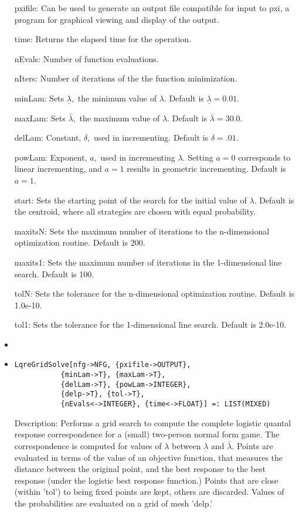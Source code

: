 \begin{itemize}
\bd
\item
[pxifile:] Can be used to generate an output file compatible for input
to pxi, a program for graphical viewing and display of the output.  
\item
[time:] Returns the elapsed time for the operation.
\item
[nEvals:] Number of function evaluations.
\item
[nIters:] Number of iterations of the the function minimization.
\item
[minLam:] Sets $\underline\lambda,$ the minimum value of $\lambda.$
Default is $\underline\lambda = 0.01$.
\item
[maxLam:] Sets $\bar\lambda,$ the maximum value of $\lambda.$  Default is
$\bar\lambda = 30.0.$
\item
[delLam:]  Constant, $\delta,$ used in incrementing.   Default is
$\delta = .01.$
\item
[powLam:] Exponent, $a,$ used in incrementing $\lambda.$  Setting $a = 0$
corresponds to linear incrementing, and $a = 1$ results in geometric
incrementing.  Default is $a = 1$.
\item
[start:] Sets the starting point of the search for the initial value of
$\lambda.$  Default is the centroid, where all strategies are chosen
with equal probability.  
\item
[maxitsN:] Sets the maximum number of iterations to the
n-dimensional optimization routine.  Default is 200.
\item
[maxits1:] Sets the maximum number of iterations in the
1-dimensional line search.  Default is 100.
\item
[tolN:] Sets the tolerance for the n-dimensional optimization
routine.  Default is 1.0e-10.
\item
[tol1:] Sets the tolerance for the 1-dimensional line search.
Default is 2.0e-10.
\item
\ed
\ed

\item
\protect \large \begin{verbatim}
LqreGridSolve[nfg->NFG, {pxifile->OUTPUT},
           {minLam->T}, {maxLam->T}, 
           {delLam->T}, {powLam->INTEGER}, 
           {delp->T}, {tol->T},
           {nEvals<->INTEGER}, {time<->FLOAT}] =: LIST(MIXED)
\end{verbatim}\normalsize

\bd
\item
[Description:] Performs a grid search to compute the complete logistic
quantal response correspondence for a (small) two-person normal form
game.  The correspondence is computed for values of $\lambda$ between
$\underline{\lambda}$ and $\bar{\lambda}.$ Points are evaluated in
terms of the value of an objective function, that measures the
distance between the original point, and the best response to the best
response (under the logistic best response function.)  Points that are
close (within 'tol') to being fixed points are kept, others are
discarded.  Values of the probabilities are evaluated on a grid of
mesh 'delp.'


\end{itemize}
